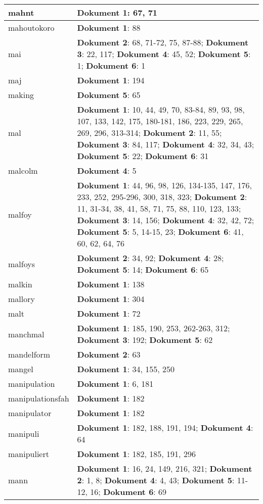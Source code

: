 \documentclass[a5paper]{article}
\begin{document}
\begin{longtable}[l]{|l|p{3in}|}
\hline
mahnt & \textbf{Dokument 1}: 67, 71 \\
\hline
mahoutokoro & \textbf{Dokument 1}: 88 \\
\hline
mai & \textbf{Dokument 2}: 68, 71-72, 75, 87-88; \textbf{Dokument 3}: 22, 117; \textbf{Dokument 4}: 45, 52; \textbf{Dokument 5}: 1; \textbf{Dokument 6}: 1 \\
\hline
maj & \textbf{Dokument 1}: 194 \\
\hline
making & \textbf{Dokument 5}: 65 \\
\hline
mal & \textbf{Dokument 1}: 10, 44, 49, 70, 83-84, 89, 93, 98, 107, 133, 142, 175, 180-181, 186, 223, 229, 265, 269, 296, 313-314; \textbf{Dokument 2}: 11, 55; \textbf{Dokument 3}: 84, 117; \textbf{Dokument 4}: 32, 34, 43; \textbf{Dokument 5}: 22; \textbf{Dokument 6}: 31 \\
\hline
malcolm & \textbf{Dokument 4}: 5 \\
\hline
malfoy & \textbf{Dokument 1}: 44, 96, 98, 126, 134-135, 147, 176, 233, 252, 295-296, 300, 318, 323; \textbf{Dokument 2}: 11, 31-34, 38, 41, 58, 71, 75, 88, 110, 123, 133; \textbf{Dokument 3}: 14, 156; \textbf{Dokument 4}: 32, 42, 72; \textbf{Dokument 5}: 5, 14-15, 23; \textbf{Dokument 6}: 41, 60, 62, 64, 76 \\
\hline
malfoys & \textbf{Dokument 2}: 34, 92; \textbf{Dokument 4}: 28; \textbf{Dokument 5}: 14; \textbf{Dokument 6}: 65 \\
\hline
malkin & \textbf{Dokument 1}: 138 \\
\hline
mallory & \textbf{Dokument 1}: 304 \\
\hline
malt & \textbf{Dokument 1}: 72 \\
\hline
manchmal & \textbf{Dokument 1}: 185, 190, 253, 262-263, 312; \textbf{Dokument 3}: 192; \textbf{Dokument 5}: 62 \\
\hline
mandelform & \textbf{Dokument 2}: 63 \\
\hline
mangel & \textbf{Dokument 1}: 34, 155, 250 \\
\hline
manipulation & \textbf{Dokument 1}: 6, 181 \\
\hline
manipulationsfah & \textbf{Dokument 1}: 182 \\
\hline
manipulator & \textbf{Dokument 1}: 182 \\
\hline
manipuli & \textbf{Dokument 1}: 182, 188, 191, 194; \textbf{Dokument 4}: 64 \\
\hline
manipuliert & \textbf{Dokument 1}: 182, 185, 191, 296 \\
\hline
mann & \textbf{Dokument 1}: 16, 24, 149, 216, 321; \textbf{Dokument 2}: 1, 8; \textbf{Dokument 4}: 4, 43; \textbf{Dokument 5}: 11-12, 16; \textbf{Dokument 6}: 69 \\

\end{longtable}
\end{document}

